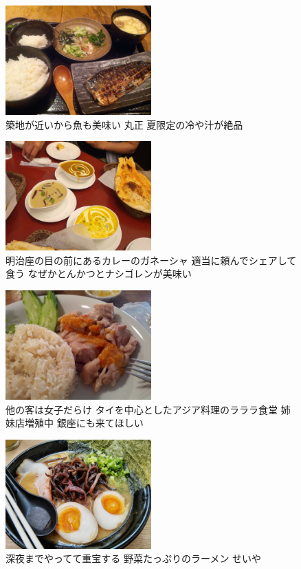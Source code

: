 \begin{figure}[H]
  \centering
  \includegraphics[width=0.5\textwidth]{../images/marushow.jpg}
  \caption{築地が近いから魚も美味い 丸正 夏限定の冷や汁が絶品}
\end{figure}

\begin{figure}[H]
  \centering
  \includegraphics[width=0.5\textwidth]{../images/ganeza.jpg}
  \caption{明治座の目の前にあるカレーのガネーシャ 適当に頼んでシェアして食う なぜかとんかつとナシゴレンが美味い}
\end{figure}

\begin{figure}[H]
  \centering
  \includegraphics[width=0.5\textwidth]{../images/rarara.jpg}
  \caption{他の客は女子だらけ タイを中心としたアジア料理のラララ食堂 姉妹店増殖中 銀座にも来てほしい}
\end{figure}

\begin{figure}[H]
  \centering
  \includegraphics[width=0.5\textwidth]{../images/seiya.jpg}
  \caption{深夜までやってて重宝する 野菜たっぷりのラーメン せいや}
\end{figure}

